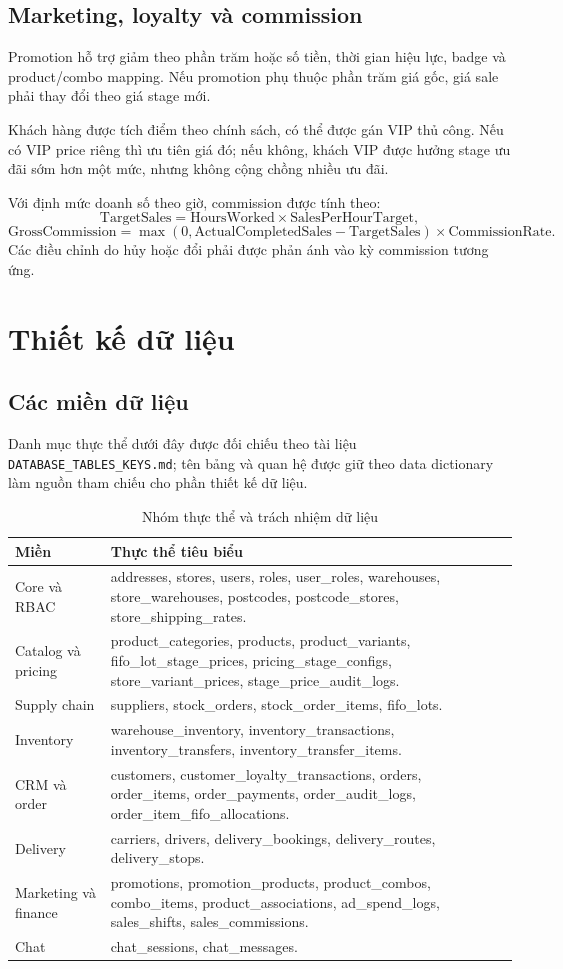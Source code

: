 \documentclass[12pt,a4paper]{report}
\begin{document}
\section{Marketing, loyalty và commission}
Promotion hỗ trợ giảm theo phần trăm hoặc số tiền, thời gian hiệu lực, badge và product/combo mapping. Nếu promotion phụ thuộc phần trăm giá gốc, giá sale phải thay đổi theo giá stage mới.

Khách hàng được tích điểm theo chính sách, có thể được gán VIP thủ công. Nếu có VIP price riêng thì ưu tiên giá đó; nếu không, khách VIP được hưởng stage ưu đãi sớm hơn một mức, nhưng không cộng chồng nhiều ưu đãi.

Với định mức doanh số theo giờ, commission được tính theo:
\[
  \text{TargetSales}=\text{HoursWorked}\times\text{SalesPerHourTarget},
\]
\[
  \text{GrossCommission}=\max(0,\text{ActualCompletedSales}-\text{TargetSales})
  \times\text{CommissionRate}.
\]
Các điều chỉnh do hủy hoặc đổi phải được phản ánh vào kỳ commission tương ứng.

\chapter{Thiết kế dữ liệu}
\section{Các miền dữ liệu}
Danh mục thực thể dưới đây được đối chiếu theo tài liệu \texttt{DATABASE\_TABLES\_KEYS.md}; tên bảng và quan hệ được giữ theo data dictionary làm nguồn tham chiếu cho phần thiết kế dữ liệu.
\begin{table}[H]
\centering
\begin{tabularx}{\textwidth}{P{3.8cm}Y}
\toprule
Miền & Thực thể tiêu biểu\\
\midrule
Core và RBAC & addresses, stores, users, roles, user\_roles, warehouses, store\_warehouses, postcodes, postcode\_stores, store\_shipping\_rates.\\
Catalog và pricing & product\_categories, products, product\_variants, fifo\_lot\_stage\_prices, pricing\_stage\_configs, store\_variant\_prices, stage\_price\_audit\_logs.\\
Supply chain & suppliers, stock\_orders, stock\_order\_items, fifo\_lots.\\
Inventory & warehouse\_inventory, inventory\_transactions, inventory\_transfers, inventory\_transfer\_items.\\
CRM và order & customers, customer\_loyalty\_transactions, orders, order\_items, order\_payments, order\_audit\_logs, order\_item\_fifo\_allocations.\\
Delivery & carriers, drivers, delivery\_bookings, delivery\_routes, delivery\_stops.\\
Marketing và finance & promotions, promotion\_products, product\_combos, combo\_items, product\_associations, ad\_spend\_logs, sales\_shifts, sales\_commissions.\\
Chat & chat\_sessions, chat\_messages.\\
\bottomrule
\end{tabularx}
\caption{Nhóm thực thể và trách nhiệm dữ liệu}
\end{table}
\end{document}
